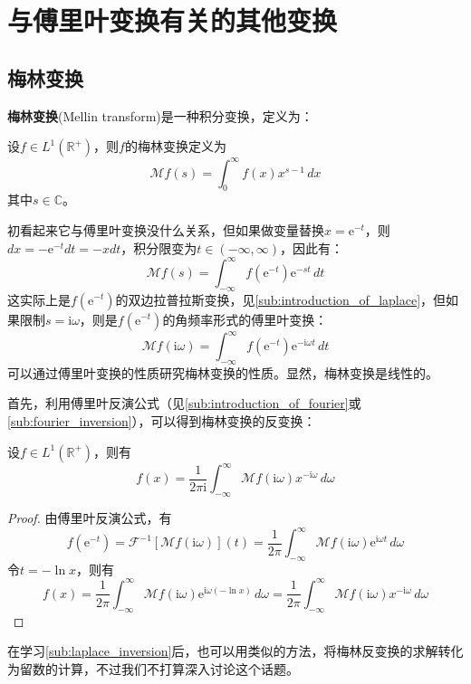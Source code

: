 \section{与傅里叶变换有关的其他变换}\label{sec:Other_Transforms}

\subsection{梅林变换}\label{sub:mellin}

\textbf{梅林变换}(Mellin transform)是一种积分变换，定义为：
\begin{definition}[梅林变换]
    设$f\in L^1(\mathbb{R}^+)$，则$f$的梅林变换定义为
    \[\mathcal{M} f(s)=\int_0^{\infty}f(x)x^{s-1}\,dx\]
    其中$s\in\mathbb{C}$。    
\end{definition}

初看起来它与傅里叶变换没什么关系，但如果做变量替换$x=\mathrm{e}^{-t}$，则$dx=-\mathrm{e}^{-t}dt=-x dt$，积分限变为$t\in(-\infty,\infty)$，因此有：
\[\mathcal{M} f(s)=\int_{-\infty}^{\infty}f(\mathrm{e}^{-t})\mathrm{e}^{-s t}\,dt\]
这实际上是$f(\mathrm{e}^{-t})$的双边拉普拉斯变换，见\ref{sub:introduction_of_laplace}，但如果限制$s=\mathrm{i}\omega$，则是$f(\mathrm{e}^{-t})$的角频率形式的傅里叶变换：
\[\mathcal{M} f(\mathrm{i}\omega)=\int_{-\infty}^{\infty}f(\mathrm{e}^{-t})\mathrm{e}^{-\mathrm{i}\omega t}\,dt\]
可以通过傅里叶变换的性质研究梅林变换的性质。显然，梅林变换是线性的。

首先，利用傅里叶反演公式（见\ref{sub:introduction_of_fourier}或\ref{sub:fourier_inversion}），可以得到梅林变换的反变换：
\begin{proposition}[梅林反变换]
    设$f\in L^1(\mathbb{R}^+)$，则有
    \[f(x)=\frac{1}{2\pi \mathrm{i}}\int_{-\infty}^{\infty}\mathcal{M} f(\mathrm{i}\omega)x^{-\mathrm{i}\omega}\,d\omega\]
\end{proposition}
\begin{proof}
    由傅里叶反演公式，有
    \[f(\mathrm{e}^{-t})=\mathcal{F} ^{-1}[\mathcal{M} f(\mathrm{i}\omega)](t)=\frac{1}{2\pi}\int_{-\infty}^{\infty}\mathcal{M} f(\mathrm{i}\omega)\mathrm{e}^{\mathrm{i}\omega t}\,d\omega\]
    令$t=-\ln x$，则有
    \[f(x)=\frac{1}{2\pi}\int_{-\infty}^{\infty}\mathcal{M} f(\mathrm{i}\omega)\mathrm{e}^{\mathrm{i}\omega (-\ln x)}\,d\omega=\frac{1}{2\pi}\int_{-\infty}^{\infty}\mathcal{M} f(\mathrm{i}\omega)x^{-\mathrm{i}\omega}\,d\omega\]
\end{proof}

在学习\ref{sub:laplace_inversion}后，也可以用类似的方法，将梅林反变换的求解转化为留数的计算，不过我们不打算深入讨论这个话题。


